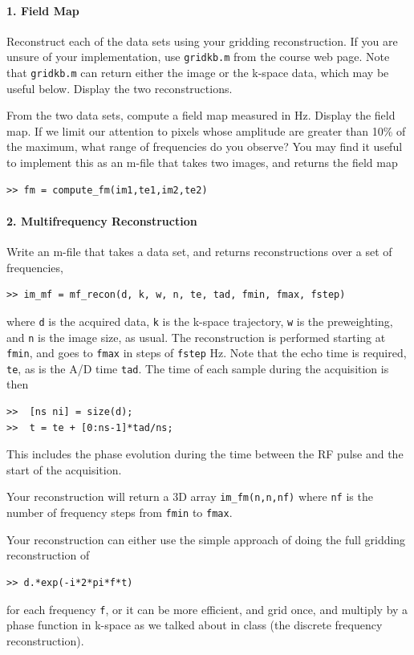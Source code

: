 \documentclass[11pt]{article}
\begin{document}
\paragraph*{\bf 1. Field Map}

Reconstruct each of the data sets using your gridding reconstruction.  If you are unsure of your implementation, use \verb+gridkb.m+ from the course web page.  Note that \verb+gridkb.m+ can return either the image or the k-space data, which may be useful below.  Display the two reconstructions.

From the two data sets, compute a field map measured in Hz. Display the field map.   If we limit our attention to pixels whose amplitude are  greater than 10\% of the maximum, what range of frequencies do you observe?  You may find it useful to implement this as an m-file that takes two images, and returns the field map
\begin{verbatim}
>> fm = compute_fm(im1,te1,im2,te2)
\end{verbatim}

\paragraph*{2. Multifrequency Reconstruction}

Write an m-file that takes a data set, and returns reconstructions over a set of frequencies,
\begin{verbatim}
>> im_mf = mf_recon(d, k, w, n, te, tad, fmin, fmax, fstep)
\end{verbatim}
where \verb+d+ is the acquired data, \verb+k+ is the k-space trajectory, \verb+w+ is the preweighting, and \verb+n+ is the image size, as usual.  The reconstruction is performed starting at \verb+fmin+, and goes to \verb+fmax+ in steps of \verb+fstep+ Hz.   Note that the echo time is required, \verb+te+, as is the A/D time \verb+tad+.  The time of each sample during the acquisition is then
\begin{verbatim}
>>  [ns ni] = size(d);
>>  t = te + [0:ns-1]*tad/ns;
\end{verbatim}
This includes the phase evolution during the time between the RF pulse and the start of the acquisition.

Your reconstruction will return a 3D array  \verb+im_fm(n,n,nf)+ where \verb+nf+ is the number of frequency steps from \verb+fmin+ to \verb+fmax+.

Your reconstruction can either use the simple approach of doing the full gridding reconstruction of
\begin{verbatim}
>> d.*exp(-i*2*pi*f*t)
\end{verbatim}
for each frequency \verb+f+, or it can be more efficient, and grid once, and multiply by a phase function in k-space as we talked about in class (the discrete frequency reconstruction).
\end{document}
